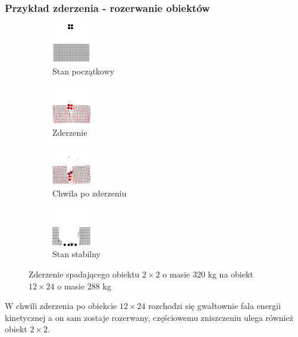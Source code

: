 \documentclass{beamer}
\begin{document}
\begin{frame}
    \frametitle{Przykład zderzenia - rozerwanie obiektów}
    \begin{figure}[h]

        \begin{subfigure}{0.4\textwidth}
            \centering
            \includegraphics[width=1.7cm, height=1.7cm]{collision_2x2_24x12_mass80_1}
            \caption{Stan początkowy}
        \end{subfigure}
        \begin{subfigure}{0.4\textwidth}
            \centering
            \includegraphics[width=1.7cm, height=1.7cm]{collision_2x2_24x12_mass80_2}
            \caption{Zderzenie}
        \end{subfigure}
        \begin{subfigure}{0.4\textwidth}
            \centering
            \includegraphics[width=1.7cm, height=1.7cm]{collision_2x2_24x12_mass80_3}
            \caption{Chwila po zderzeniu}
        \end{subfigure}
        \begin{subfigure}{0.4\textwidth}
            \centering
            \includegraphics[width=1.7cm, height=1.7cm]{collision_2x2_24x12_mass80_4}
            \caption{Stan stabilny}
        \end{subfigure}

        \caption{Zderzenie spadającego obiektu $2 \times 2$ o masie 320 kg na obiekt $12 \times 24$ o masie 288 kg}
    \end{figure}

    W chwili zderzenia po obiekcie $12 \times 24$ rozchodzi się gwałtownie fala energii kinetycznej a on sam zostaje
    rozerwany, częściowemu zniszczeniu ulega również obiekt $2 \times 2$.
\end{frame}
\end{document}
